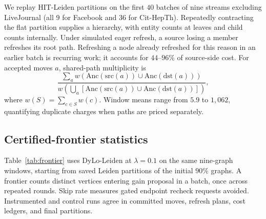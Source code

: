 We replay HIT-Leiden partitions on the first $40$ batches of nine streams
excluding LiveJournal (all $9$ for Facebook and $36$ for Cit-HepTh).
Repeatedly contracting the flat partition supplies a hierarchy, with
entity counts at leaves and child counts internally.
Under simulated eager refresh, a source losing a member refreshes its
root path. Refreshing a node already refreshed for this reason in an earlier
batch is recurring work; it accounts for $44$--$96\%$ of source-side cost.
For accepted moves $a$, shared-path multiplicity is
\[
\frac{\sum_a w(\mathrm{Anc}(\mathrm{src}(a))\cup
                         \mathrm{Anc}(\mathrm{dst}(a)))}
 {w(\bigcup_a[\mathrm{Anc}(\mathrm{src}(a))\cup
                         \mathrm{Anc}(\mathrm{dst}(a))])},
\]
where $w(S)=\sum_{c\in S}w(c)$. Window means range from $5.9$ to $1{,}062$,
quantifying duplicate charges when paths are priced separately.

\subsection{Certified-frontier statistics}\label{app:frontier}

Table~\ref{tab:frontier} uses DyLo-Leiden at $\lambda=0.1$ on the same
nine-graph windows, starting from saved Leiden partitions of the initial
$90\%$ graphs. A frontier counts distinct vertices entering gain proposal
in a batch, once across repeated rounds. Skip rate measures gated endpoint
recheck requests avoided. Instrumented and control runs agree in committed
moves, refresh plans, cost ledgers, and final partitions.

